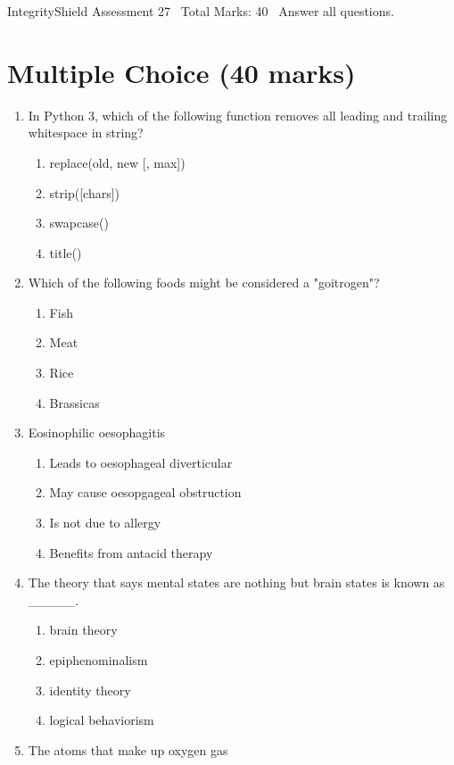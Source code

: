 \documentclass[12pt]{article}
\begin{document}
\begin{center}
IntegrityShield Assessment 27 \
Total Marks: 40 \
Answer all questions.
\end{center}

\section*{Multiple Choice (40 marks)}
\begin{enumerate}[label=\arabic*.]
\item In Python 3, which of the following function removes all leading and trailing whitespace in string?
\begin{enumerate}[label=(\alph*)]
    \item replace(old, new [, max])
    \item strip([chars])
    \item swapcase()
    \item title()
\end{enumerate}
\item Which of the following foods might be considered a "goitrogen"?
\begin{enumerate}[label=(\alph*)]
    \item Fish
    \item Meat
    \item Rice
    \item Brassicas
\end{enumerate}
\item Eosinophilic oesophagitis
\begin{enumerate}[label=(\alph*)]
    \item Leads to oesophageal diverticular
    \item May cause oesopgageal obstruction
    \item Is not due to allergy
    \item Benefits from antacid therapy
\end{enumerate}
\item The theory that says mental states are nothing but brain states is known as \_\_\_\_\_.
\begin{enumerate}[label=(\alph*)]
    \item brain theory
    \item epiphenominalism
    \item identity theory
    \item logical behaviorism
\end{enumerate}
\item The atoms that make up oxygen gas

\end{enumerate}
\end{document}
